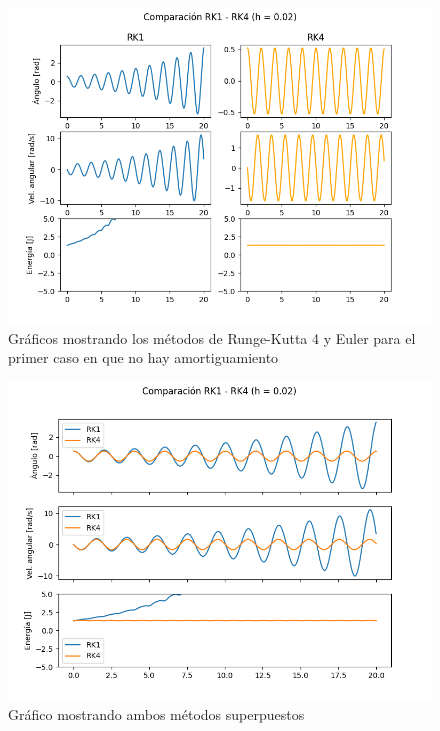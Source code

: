 \documentclass[titlepage,a4paper]{article}
\begin{document}
    \begin{figure}[H]
        \centering
        \includegraphics[scale = 0.4]{noAmortiguado1.png}
        \caption{Gráficos mostrando los métodos de Runge-Kutta 4 y Euler para el primer caso en que no hay amortiguamiento}
    \end{figure}
    
    \begin{figure}[H]
        \centering
        \includegraphics[scale = 0.4]{noAmortiguado2.png}
        \caption{Gráfico mostrando ambos métodos superpuestos}
        \label{fig:noAmortiguadoGrafJuntos}
    \end{figure}
    
\end{document}
